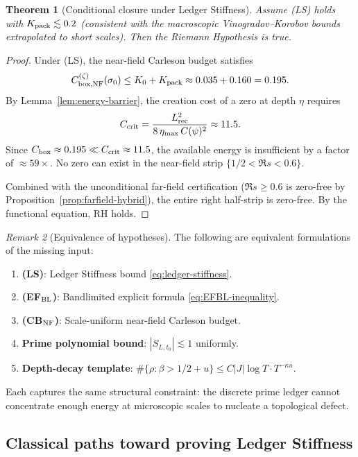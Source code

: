 \documentclass[11pt]{article}
\newtheorem{theorem}{Theorem}
\theoremstyle{definition}
\theoremstyle{remark}
\newtheorem{remark}[theorem]{Remark}
\theoremstyle{definition}
\begin{document}
\begin{theorem}[Conditional closure under Ledger Stiffness]\label{thm:ledger-closure}
Assume \textup{(LS)} holds with $K_{\rm pack} \lesssim 0.2$ (consistent with the macroscopic Vinogradov--Korobov bounds extrapolated to short scales). Then the Riemann Hypothesis is true.
\end{theorem}
\begin{proof}
Under \textup{(LS)}, the near-field Carleson budget satisfies
\[
  C_{{\rm box},{\rm NF}}^{(\zeta)}(\sigma_0) \le K_0 + K_{\rm pack} \approx 0.035 + 0.160 = 0.195.
\]
By Lemma~\ref{lem:energy-barrier}, the creation cost of a zero at depth $\eta$ requires
\[
  C_{\rm crit} = \frac{L_{\rm rec}^2}{8\,\eta_{\max}\,C(\psi)^2} \approx 11.5.
\]
Since $C_{\rm box} \approx 0.195 \ll C_{\rm crit} \approx 11.5$, the available energy is insufficient by a factor of $\approx 59\times$. No zero can exist in the near-field strip $\{1/2 < \Re s < 0.6\}$.

Combined with the unconditional far-field certification ($\Re s \ge 0.6$ is zero-free by Proposition~\ref{prop:farfield-hybrid}), the entire right half-strip is zero-free. By the functional equation, RH holds.
\end{proof}

\begin{remark}[Equivalence of hypotheses]\label{rem:hypothesis-equivalence}
The following are equivalent formulations of the missing input:
\begin{enumerate}
\item \textbf{(LS)}: Ledger Stiffness bound \eqref{eq:ledger-stiffness}.
\item \textbf{(EF$_{\rm BL}$)}: Bandlimited explicit formula \eqref{eq:EFBL-inequality}.
\item \textbf{(CB$_{\rm NF}$)}: Scale-uniform near-field Carleson budget.
\item \textbf{Prime polynomial bound}: $|S_{L,t_0}| \lesssim 1$ uniformly.
\item \textbf{Depth-decay template}: $\#\{\rho : \beta > 1/2+u\} \le C|J|\log T \cdot T^{-\kappa u}$.
\end{enumerate}
Each captures the same structural constraint: the discrete prime ledger cannot concentrate enough energy at microscopic scales to nucleate a topological defect.
\end{remark}


\subsection*{Classical paths toward proving Ledger Stiffness}\label{sec:classical-paths}
\end{document}
